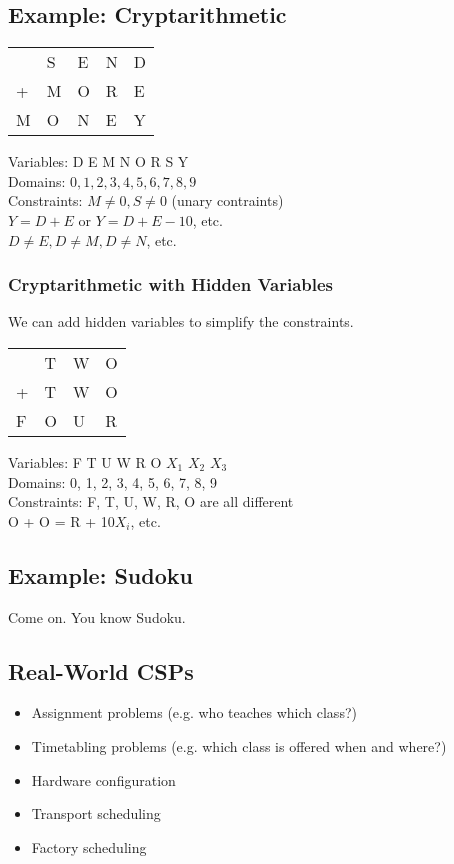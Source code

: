 \subsection{Example: Cryptarithmetic}
\begin{tabular}{| l | l | l | l | l |}
& S & E & N & D\\
+ & M & O & R & E\\
\hline
M & O & N & E & Y
\end{tabular}

Variables: D E M N O R S Y\\
Domains: ${0, 1, 2, 3, 4, 5, 6, 7, 8, 9}$\\
Constraints: $M \neq 0, S \neq 0$ (unary contraints)\\
\indent $ Y = D + E$ or $Y = D + E - 10$, etc.\\
\indent $D \neq E, D \neq M, D \neq N$, etc.

\subsubsection{Cryptarithmetic with Hidden Variables}
We can add hidden variables to simplify the constraints.

\begin{tabular}{| l | l | l | l |}
& T & W & O\\
+ & T & W & O\\
\hline
F & O & U & R
\end{tabular}

Variables: F T U W R O $X_1$ $X_2$ $X_3$\\
Domains: {0, 1, 2, 3, 4, 5, 6, 7, 8, 9}\\
Constraints: F, T, U, W, R, O are all different\\
\indent O + O = R + 10$X_i$, etc.

\subsection{Example: Sudoku}
Come on. You know Sudoku.

\subsection{Real-World CSPs}
\begin{itemize}
    \item Assignment problems (e.g. who teaches which class?)
    \item Timetabling problems (e.g. which class is offered when and where?)
    \item Hardware configuration
    \item Transport scheduling
    \item Factory scheduling
\end{itemize}

